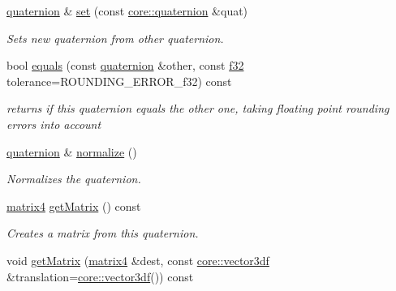 \begin{DoxyCompactItemize}
\hyperlink{classirr_1_1core_1_1quaternion}{quaternion} \& \hyperlink{classirr_1_1core_1_1quaternion_aa99cf40ab088323e5fc31ccdbe9fa2ad}{set} (const \hyperlink{classirr_1_1core_1_1quaternion}{core\+::quaternion} \&quat)
\begin{DoxyCompactList}\small\item\em Sets new quaternion from other quaternion. \end{DoxyCompactList}\item 
\mbox{\label{classirr_1_1core_1_1quaternion_a3b659f864cfce80be65b44ecf565566c}} 
bool \hyperlink{classirr_1_1core_1_1quaternion_a3b659f864cfce80be65b44ecf565566c}{equals} (const \hyperlink{classirr_1_1core_1_1quaternion}{quaternion} \&other, const \hyperlink{namespaceirr_a0277be98d67dc26ff93b1a6a1d086b07}{f32} tolerance=R\+O\+U\+N\+D\+I\+N\+G\+\_\+\+E\+R\+R\+O\+R\+\_\+f32) const
\begin{DoxyCompactList}\small\item\em returns if this quaternion equals the other one, taking floating point rounding errors into account \end{DoxyCompactList}\item 
\mbox{\label{classirr_1_1core_1_1quaternion_aac7a34ffd2a14a78de12d994539b94f9}} 
\hyperlink{classirr_1_1core_1_1quaternion}{quaternion} \& \hyperlink{classirr_1_1core_1_1quaternion_aac7a34ffd2a14a78de12d994539b94f9}{normalize} ()
\begin{DoxyCompactList}\small\item\em Normalizes the quaternion. \end{DoxyCompactList}\item 
\mbox{\label{classirr_1_1core_1_1quaternion_a23c2056aa77d1d53b2cebce7cf05ea47}} 
\hyperlink{namespaceirr_1_1core_a4c9d4e29899535971052810954a14431}{matrix4} \hyperlink{classirr_1_1core_1_1quaternion_a23c2056aa77d1d53b2cebce7cf05ea47}{get\+Matrix} () const
\begin{DoxyCompactList}\small\item\em Creates a matrix from this quaternion. \end{DoxyCompactList}\item 
void \hyperlink{classirr_1_1core_1_1quaternion_a333ab73cbc2b334ea9f5fe6a5a66058e}{get\+Matrix} (\hyperlink{namespaceirr_1_1core_a4c9d4e29899535971052810954a14431}{matrix4} \&dest, const \hyperlink{namespaceirr_1_1core_ae6e2b2a6c552833ebbd5b7463d03586b}{core\+::vector3df} \&translation=\hyperlink{namespaceirr_1_1core_ae6e2b2a6c552833ebbd5b7463d03586b}{core\+::vector3df}()) const

\end{DoxyCompactItemize}
